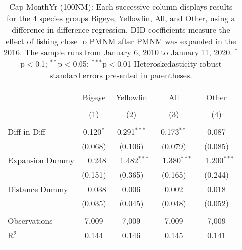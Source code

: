 
\begin{table}[!htbp] \centering 
  \caption{Cap MonthYr (100NM): Each successive column displays results for the 4 species groups Bigeye, Yellowfin, All, and Other, using a difference-in-difference regression. DID coefficients measure the effect of fishing close to PMNM after PMNM was expanded in the 2016. The sample runs from January 6, 2010 to January 11, 2020. $^{*}$p$<$0.1; $^{**}$p$<$0.05; $^{***}$p$<$0.01 Heteroskedasticity-robust standard errors presented in parentheses.} 
  \label{tbl:timeFE100NM} 
\begin{tabular}{@{\extracolsep{5pt}}lcccc} 
\\[-1.8ex]\hline 
\hline \\[-1.8ex] 
 & Bigeye & Yellowfin & All & Other \\ 
\\[-1.8ex] & (1) & (2) & (3) & (4)\\ 
\hline \\[-1.8ex] 
 Diff in Diff & 0.120$^{*}$ & 0.291$^{***}$ & 0.173$^{**}$ & 0.087 \\ 
  & (0.068) & (0.106) & (0.079) & (0.085) \\ 
  Expansion Dummy & $-$0.248 & $-$1.482$^{***}$ & $-$1.380$^{***}$ & $-$1.200$^{***}$ \\ 
  & (0.151) & (0.365) & (0.165) & (0.244) \\ 
  Distance Dummy & $-$0.038 & 0.006 & 0.002 & 0.018 \\ 
  & (0.035) & (0.045) & (0.048) & (0.052) \\ 
 \hline \\[-1.8ex] 
Observations & 7,009 & 7,009 & 7,009 & 7,009 \\ 
R$^{2}$ & 0.144 & 0.146 & 0.145 & 0.141 \\ 
\hline 
\hline \\[-1.8ex] 
\end{tabular} 
\end{table} 
